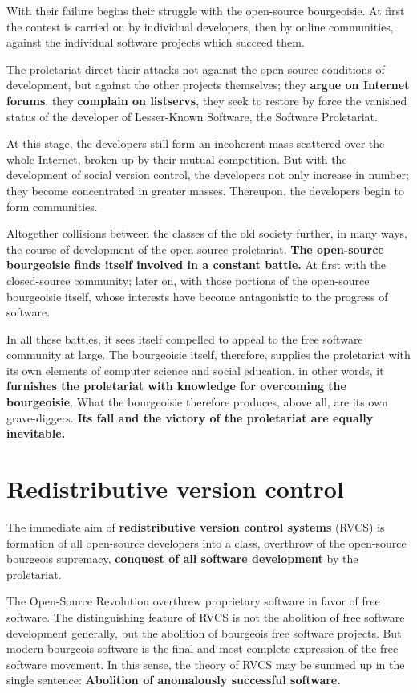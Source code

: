 \documentclass[10pt]{article}
\begin{document}
With their failure begins their struggle with the open-source bourgeoisie. At
first the contest is carried on by individual developers, then by online
communities, against the individual software projects which succeed them. 

The proletariat direct their attacks not against the open-source conditions of
development, but against the other projects themselves; they \textbf{argue on
Internet forums}, they \textbf{complain on listservs}, they seek to restore by
force the vanished status of the developer of Lesser-Known Software, the
Software Proletariat.

At this stage, the developers still form an incoherent mass scattered over the
whole Internet, broken up by their mutual competition. But with the development
of social version control, the developers not only increase in number; they
become concentrated in greater masses. Thereupon, the developers begin to form
communities.

Altogether collisions between the classes of the old society further, in many
ways, the course of development of the open-source proletariat. \textbf{The
open-source bourgeoisie finds itself involved in a constant battle.} At first
with the closed-source community; later on, with those portions of the
open-source bourgeoisie itself, whose interests have become antagonistic to the
progress of software.

In all these battles, it sees itself compelled to appeal to the free software
community at large. The bourgeoisie itself, therefore, supplies the proletariat
with its own elements of computer science and social education, in other words,
it \textbf{furnishes the proletariat with knowledge for overcoming the
bourgeoisie}. What the bourgeoisie therefore produces, above all, are its own
grave-diggers. \textbf{Its fall and the victory of the proletariat are equally
inevitable.}

\section{Redistributive version control}

The immediate aim of \textbf{redistributive version control systems} (RVCS) is
formation of all open-source developers into a class, overthrow of the
open-source bourgeois supremacy, \textbf{conquest of all software development}
by the proletariat.

The Open-Source Revolution overthrew proprietary software in favor of free
software. The distinguishing feature of RVCS is not the abolition of free
software development generally, but the abolition of bourgeois free software
projects. But modern bourgeois software is the final and most complete
expression of the free software movement. In this sense, the theory of RVCS may
be summed up in the single sentence: \textbf{Abolition of anomalously successful
software.}
\end{document}

